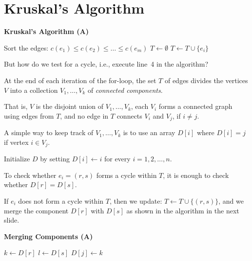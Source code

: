 \section{Kruskal's Algorithm}

\begin{frame}
{\bf Kruskal's Algorithm (A\fi)}

\begin{algorithmic}[1]
\STATE Sort the edges: $c(e_1)\leq c(e_2)\leq\ldots\leq c(e_m)$ 
\STATE $T\longleftarrow\emptyset$ 
        \STATE $T\longleftarrow T\cup\{e_i\}$
    \ENDIF
\ENDFOR
\end{algorithmic}
\end{frame}

\begin{frame}
But how do we test for a cycle, i.e., execute line~4 in
the algorithm?  

At the end of each
iteration of the for-loop, the set $T$ of edges divides the vertices $V$
into a collection $V_1,\ldots,V_k$ of {\em connected
components}.

That is, $V$ is the disjoint union of $V_1,\ldots,V_k$, each $V_i$ forms a
connected graph using edges from $T$, and no edge in $T$ connects
$V_i$ and $V_j$, if $i\neq j$.  

A simple way to keep track of
$V_1,\ldots,V_k$ is to use an array $D[i]$ where $D[i]=j$ if vertex
$i\in V_j$. 
\end{frame}

\begin{frame}
Initialize $D$ by setting
$D[i]\longleftarrow i$ for every $i=1,2,\ldots,n$.

To check whether $e_i=(r,s)$ forms a cycle within $T$, it is enough to
check whether $D[r]=D[s]$.  

If $e_i$ does not form a cycle within $T$,
then we update: $T\longleftarrow T\cup\{(r,s)\}$, and we merge the
component $D[r]$ with $D[s]$ as shown in
the algorithm in the next slide.
\end{frame}

\begin{frame}
{\bf Merging Components (A\fi)}

\begin{algorithmic}[1]
\STATE $k\longleftarrow D[r]$ 
\STATE $l\longleftarrow D[s]$ 
        \STATE $D[j]\longleftarrow k$
     \ENDIF
\ENDFOR
\end{algorithmic}
\end{frame}

